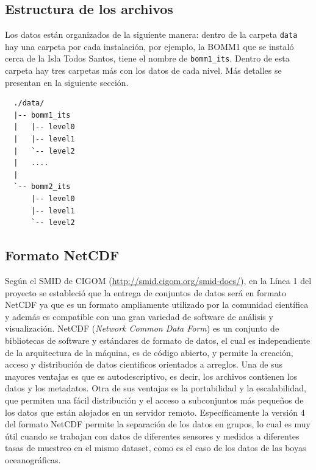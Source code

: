 \documentclass[11pt]{article}
\begin{document}

\subsection{Estructura de los archivos}
\label{sub:estructura_de_los_archivos}

Los datos están organizados de la siguiente manera: dentro de la carpeta
\texttt{data} hay una carpeta por cada instalación, por ejemplo, la BOMM1 que se
instaló cerca de la Isla Todos Santos, tiene el nombre de
\texttt{bomm1\_its}. Dentro de esta carpeta hay tres carpetas más con los datos
de cada nivel. Más detalles se presentan en la siguiente sección.


\begin{verbatim}
  ./data/
  |-- bomm1_its
  |   |-- level0
  |   |-- level1
  |   `-- level2
  |   ....
  |    
  `-- bomm2_its
      |-- level0
      |-- level1
      `-- level2
\end{verbatim}

\subsection{Formato NetCDF}
\label{sub:formato_netcdf}

Según el SMID de CIGOM (\url{http://smid.cigom.org/smid-docs/}), en la Línea 1
del proyecto se estableció que la entrega de conjuntos de datos será en formato
NetCDF ya que es un formato ampliamente utilizado por la comunidad científica y
además es compatible con una gran variedad de software de análisis y
visualización. NetCDF (\emph{Network Common Data Form}) es un conjunto de
bibliotecas de software y estándares de formato de datos, el cual es
independiente de la arquitectura de la máquina, es de código abierto, y permite
la creación, acceso y distribución de datos cientificos orientados a arreglos.
Una de sus mayores ventajas es que es autodescriptivo, es decir, los archivos
contienen los datos y los metadatos. Otra de sus ventajas es la portabilidad y
la escalabilidad, que permiten una fácil distribución y el acceso a subconjuntos
más pequeños de los datos que están alojados en un servidor remoto.
Específicamente la versión 4 del formato NetCDF permite la separación de los
datos en grupos, lo cual es muy útil cuando se trabajan con datos de diferentes
sensores y medidos a diferentes tasas de muestreo en el mismo dataset, como es
el caso de los datos de las boyas oceanográficas.
\end{document}
